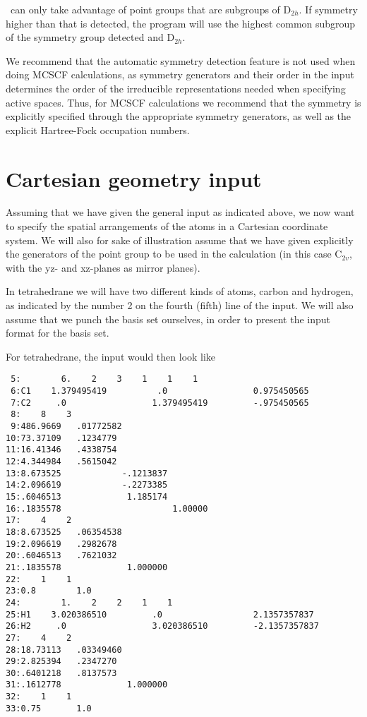 \siraba\ can only take advantage of point groups that are subgroups
of D$_{2h}$. If symmetry higher than that is detected, the program
will use the highest common subgroup of  the symmetry group
detected and D$_{2h}$.

We recommend that the automatic symmetry detection feature is not
used when doing MCSCF calculations, as symmetry
generators and their order in the input
determines the order of the irreducible  representations
needed when specifying active spaces. Thus, for MCSCF calculations
we recommend that the symmetry is  explicitly specified through
the appropriate symmetry generators, as well as the explicit
Hartree-Fock occupation numbers.

\section{Cartesian geometry input}\label{sec:molcart}

Assuming that we have given the general input as indicated above, we
now want to specify the spatial arrangements of the atoms in a
Cartesian coordinate system. We will also for sake of illustration
assume that we have given explicitly the generators of the point group
to be used in the calculation (in this case C$_{2v}$, with the yz- and
xz-planes as mirror planes).

In tetrahedrane we will have two different kinds of atoms, carbon
and hydrogen, as indicated by the number 2 on the fourth (fifth)
line of the input. We will also assume that we punch the basis set
ourselves, in order to present the input format for the basis set.

For tetrahedrane, the input would then look like
\begin{verbatim}
 5:        6.    2    3    1    1    1
 6:C1    1.379495419          .0                 0.975450565
 7:C2     .0                 1.379495419         -.975450565
 8:    8    3
 9:486.9669   .01772582
10:73.37109   .1234779
11:16.41346   .4338754
12:4.344984   .5615042
13:8.673525            -.1213837
14:2.096619            -.2273385
15:.6046513             1.185174
16:.1835578                      1.00000
17:    4    2
18:8.673525   .06354538
19:2.096619   .2982678
20:.6046513   .7621032
21:.1835578             1.000000
22:    1    1
23:0.8        1.0
24:        1.    2    2    1    1
25:H1    3.020386510         .0                  2.1357357837
26:H2     .0                 3.020386510         -2.1357357837
27:    4    2
28:18.73113   .03349460
29:2.825394   .2347270
30:.6401218   .8137573
31:.1612778             1.000000
32:    1    1
33:0.75       1.0
\end{verbatim}

